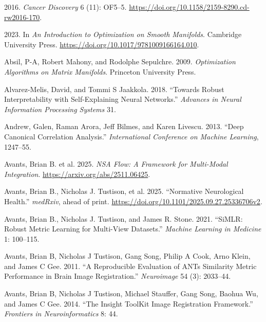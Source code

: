 \documentclass[
  letterpaper,
]{report}
\newlength{\cslhangindent}
\newenvironment{CSLReferences}[2] %
 {\begin{list}{}{%
  \setlength{\itemindent}{0pt}
  \setlength{\leftmargin}{0pt}
  \setlength{\parsep}{0pt}
  \ifodd #1
   \setlength{\leftmargin}{\cslhangindent}
   \setlength{\itemindent}{-1\cslhangindent}
  \fi
  \setlength{\itemsep}{#2\baselineskip}}}
 {\end{list}}
\begin{document}
\protect{}\label{refs}
\begin{CSLReferences}{1}{1}
2016. \emph{Cancer Discovery} 6 (11): OF5--5.
\url{https://doi.org/10.1158/2159-8290.cd-rw2016-170}.

2023. In \emph{An Introduction to Optimization on Smooth Manifolds}.
Cambridge University Press.
\url{https://doi.org/10.1017/9781009166164.010}.

Absil, P-A, Robert Mahony, and Rodolphe Sepulchre. 2009.
\emph{Optimization Algorithms on Matrix Manifolds}. Princeton University
Press.

Alvarez-Melis, David, and Tommi S Jaakkola. 2018. {``Towards Robust
Interpretability with Self-Explaining Neural Networks.''} \emph{Advances
in Neural Information Processing Systems} 31.

Andrew, Galen, Raman Arora, Jeff Bilmes, and Karen Livescu. 2013.
{``Deep Canonical Correlation Analysis.''} \emph{International
Conference on Machine Learning}, 1247--55.

{Avants, Brian B. et al.} 2025. \emph{NSA Flow: A Framework for
Multi-Modal Integration}. \url{https://arxiv.org/abs/2511.06425}.

{Avants, Brian B., Nicholas J. Tustison, et al.} 2025. {``Normative
Neurological Health.''} \emph{medRxiv}, ahead of print.
\url{https://doi.org/10.1101/2025.09.27.25336706v2}.

Avants, Brian B., Nicholas J. Tustison, and James R. Stone. 2021.
{``SiMLR: Robust Metric Learning for Multi-View Datasets.''}
\emph{Machine Learning in Medicine} 1: 100--115.

Avants, Brian B, Nicholas J Tustison, Gang Song, Philip A Cook, Arno
Klein, and James C Gee. 2011. {``A Reproducible Evaluation of ANTs
Similarity Metric Performance in Brain Image Registration.''}
\emph{Neuroimage} 54 (3): 2033--44.

Avants, Brian B, Nicholas J Tustison, Michael Stauffer, Gang Song,
Baohua Wu, and James C Gee. 2014. {``The Insight ToolKit Image
Registration Framework.''} \emph{Frontiers in Neuroinformatics} 8: 44.


\end{CSLReferences}
\end{document}
